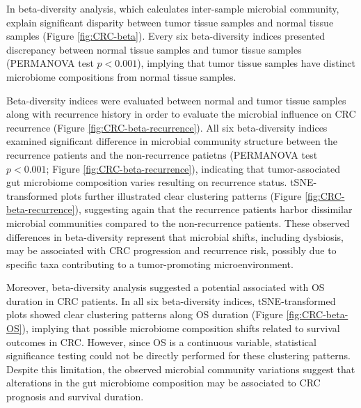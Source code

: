 \documentclass[11pt, a4paper, onecolumn, oneside]{report}
\begin{document}
                In beta-diversity analysis, which calculates inter-sample microbial community, explain significant disparity between tumor tissue samples and normal tissue samples (Figure \ref{fig:CRC-beta}). Every six beta-diversity indices presented discrepancy between normal tissue samples and tumor tissue samples (PERMANOVA test $p < 0.001$), implying that tumor tissue samples have distinct microbiome compositions from normal tissue samples.

                Beta-diversity indices were evaluated between normal and tumor tissue samples along with recurrence history  in order to evaluate the microbial influence on CRC recurrence (Figure \ref{fig:CRC-beta-recurrence}). All six beta-diversity indices examined significant difference in microbial community structure between the recurrence patients and the non-recurrence patietns (PERMANOVA test $p < 0.001$; Figure \ref{fig:CRC-beta-recurrence}), indicating that tumor-associated gut microbiome composition varies resulting on recurrence status. tSNE-transformed plots further illustrated clear clustering patterns (Figure \ref{fig:CRC-beta-recurrence}), suggesting again that the recurrence patients harbor dissimilar microbial communities compared to the non-recurrence patients. These observed differences in beta-diversity represent that microbial shifts, including dysbiosis, may be associated with CRC progression and recurrence risk, possibly due to specific taxa contributing to a tumor-promoting microenvironment.

                Moreover, beta-diversity analysis suggested a potential associated with OS duration in CRC patients. In all six beta-diversity indices, tSNE-transformed plots showed clear clustering patterns along OS duration (Figure \ref{fig:CRC-beta-OS}), implying that possible microbiome composition shifts related to survival outcomes in CRC. However, since OS is a continuous variable, statistical significance testing could not be directly performed for these clustering patterns. Despite this limitation, the observed microbial community variations suggest that alterations in the gut microbiome composition may be associated to CRC prognosis and survival duration.
\end{document}
